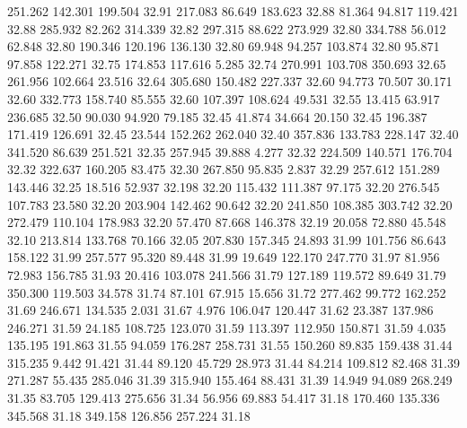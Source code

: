  251.262  142.301  199.504        32.91
 217.083   86.649  183.623        32.88
  81.364   94.817  119.421        32.88
 285.932   82.262  314.339        32.82
 297.315   88.622  273.929        32.80
 334.788   56.012   62.848        32.80
 190.346  120.196  136.130        32.80
  69.948   94.257  103.874        32.80
  95.871   97.858  122.271        32.75
 174.853  117.616    5.285        32.74
 270.991  103.708  350.693        32.65
 261.956  102.664   23.516        32.64
 305.680  150.482  227.337        32.60
  94.773   70.507   30.171        32.60
 332.773  158.740   85.555        32.60
 107.397  108.624   49.531        32.55
  13.415   63.917  236.685        32.50
  90.030   94.920   79.185        32.45
  41.874   34.664   20.150        32.45
 196.387  171.419  126.691        32.45
  23.544  152.262  262.040        32.40
 357.836  133.783  228.147        32.40
 341.520   86.639  251.521        32.35
 257.945   39.888    4.277        32.32
 224.509  140.571  176.704        32.32
 322.637  160.205   83.475        32.30
 267.850   95.835    2.837        32.29
 257.612  151.289  143.446        32.25
  18.516   52.937   32.198        32.20
 115.432  111.387   97.175        32.20
 276.545  107.783   23.580        32.20
 203.904  142.462   90.642        32.20
 241.850  108.385  303.742        32.20
 272.479  110.104  178.983        32.20
  57.470   87.668  146.378        32.19
  20.058   72.880   45.548        32.10
 213.814  133.768   70.166        32.05
 207.830  157.345   24.893        31.99
 101.756   86.643  158.122        31.99
 257.577   95.320   89.448        31.99
  19.649  122.170  247.770        31.97
  81.956   72.983  156.785        31.93
  20.416  103.078  241.566        31.79
 127.189  119.572   89.649        31.79
 350.300  119.503   34.578        31.74
  87.101   67.915   15.656        31.72
 277.462   99.772  162.252        31.69
 246.671  134.535    2.031        31.67
   4.976  106.047  120.447        31.62
  23.387  137.986  246.271        31.59
  24.185  108.725  123.070        31.59
 113.397  112.950  150.871        31.59
   4.035  135.195  191.863        31.55
  94.059  176.287  258.731        31.55
 150.260   89.835  159.438        31.44
 315.235    9.442   91.421        31.44
  89.120   45.729   28.973        31.44
  84.214  109.812   82.468        31.39
 271.287   55.435  285.046        31.39
 315.940  155.464   88.431        31.39
  14.949   94.089  268.249        31.35
  83.705  129.413  275.656        31.34
  56.956   69.883   54.417        31.18
 170.460  135.336  345.568        31.18
 349.158  126.856  257.224        31.18

